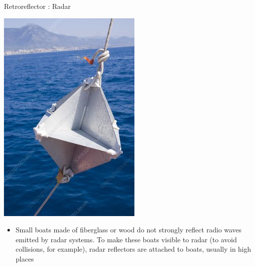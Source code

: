 \documentclass{beamer}
\begin{document}
\begin{frame}{Retroreflector : Radar}
	\begin{center}
		\includegraphics[scale=0.3]{22}
	\end{center}
	\begin{itemize}
		\item Small boats made of fiberglass or wood do not strongly reflect radio waves emitted by radar systems. To make these boats visible to radar (to avoid collisions, for example), radar reflectors are attached to boats, usually in high places
	\end{itemize}
\end{frame}
\end{document}
